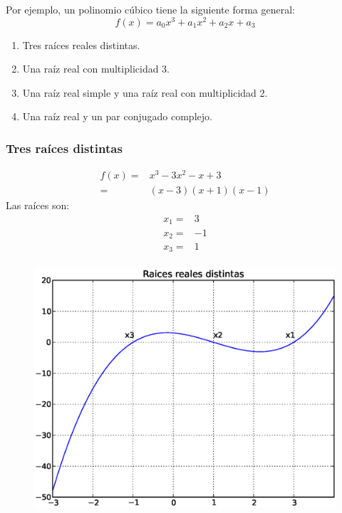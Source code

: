 \documentclass[12pt]{beamer}
\begin{document}
\begin{frame}
Por ejemplo, un polinomio c\'{u}bico tiene la siguiente
forma general:
\[ f(x)= a_{0}x^{3}+a_{1}x^{2}+a_{2}x+a_{3}\]
\begin{enumerate}
\item Tres ra\'{i}ces reales distintas.
\item Una ra\'{i}z real con multiplicidad 3.
\item Una ra\'{i}z real simple y una ra\'{i}z real con multiplicidad 2.
\item Una ra\'{i}z real y un par conjugado complejo.
\end{enumerate}
\end{frame}
\begin{frame}[fragile]
\frametitle{Tres ra\'{i}ces distintas}
\begin{minipage}{5cm}
\fontsize{12}{12}\selectfont
\[ \begin{split}
f(x)=& x^{3} - 3x^{2}-x+3 \\
=& (x-3)(x+1)(x-1)
\end{split} \]
Las ra\'{i}ces son:
\[ \begin{split}
x_{1} =& 3 \\
x_{2} =& -1 \\
x_{3} =& 1 \\
\end{split}\]
\end{minipage}
\hspace{0.5cm}
\begin{minipage}{4.5cm}
\begin{figure}
	\centering
	\includegraphics[scale=0.3]{raices01.eps} 
\end{figure}
\end{minipage}
\end{frame}
\end{document}
